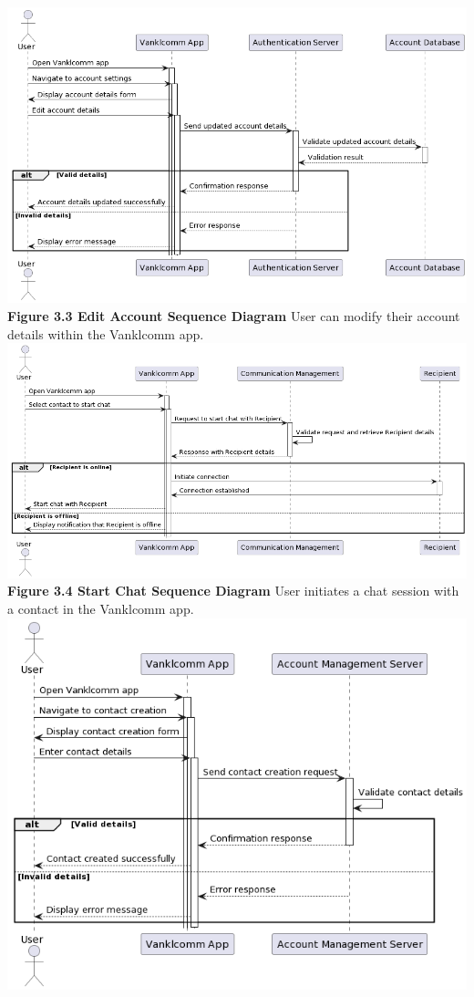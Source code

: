 \documentclass[]{article}
\begin{document}
\begin{center}
	\includegraphics[width=\textwidth]{../images/SequenceDiagram/Edit_account.png}
	\textbf{Figure 3.3 Edit Account Sequence Diagram}
	\newline User can modify their account details within the Vanklcomm app.
	\includegraphics[width=\textwidth]{../images/SequenceDiagram/Start_chat.png}
	\textbf{Figure 3.4 Start Chat Sequence Diagram}
	\newline User initiates a chat session with a contact in the Vanklcomm app.
 	\includegraphics[width=\textwidth]{../images/SequenceDiagram/Create_contact.png}

\end{center}
\end{document}
